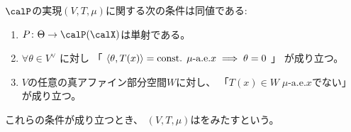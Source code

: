 \documentclass[report]{jlreq}
\begin{document}
\begin{propdef}[条件A]
    $\calP$の実現$(V, T, \mu)$に関する次の条件は同値である:
    \begin{enumerate}
        \item $P \colon \Theta \to \calP(\calX)$は単射である。
        \item $\forall \theta \in V^\vee$
            に対し
            「
                $\left\langle{\theta},{T(x)}\right\rangle = \text{const. $\mu$-a.e.$x$}
                \implies
                \theta = 0$
            」
            が成り立つ。
        \item $V$の任意の真アファイン部分空間$W$に対し、
            「$T(x) \in W \; \text{$\mu$-a.e.$x$}$でない」
            が成り立つ。
    \end{enumerate}
    これらの条件が成り立つとき、
    $(V, T, \mu)$はをみたすという。
\end{propdef}
\end{document}
